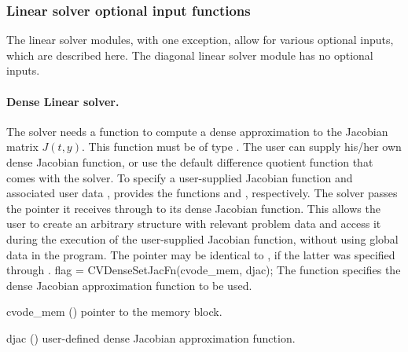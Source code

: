 \subsubsection{Linear solver optional input functions}

The linear solver modules, with one exception, allow for various optional 
inputs, which are described here. The diagonal linear solver module has no
optional inputs.

\noindent\paragraph{\bf Dense Linear solver.}
The 
{\cvdense} solver needs a function to compute a dense approximation to
the Jacobian matrix $J(t,y)$.  This function must be of type . 
The user can supply his/her own dense Jacobian function, or use the default 
difference quotient function  
that comes with the {\cvdense} solver.
To specify a user-supplied Jacobian function  and associated user 
data , {\cvdense} provides the functions 
and , respectively.
The {\cvdense} solver passes the pointer it receives through  
to its dense Jacobian function. This allows the user to
create an arbitrary structure with relevant problem data and access it
during the execution of the user-supplied Jacobian function, without
using global data in the program.  The pointer  may be
identical to , if the latter was specified through .
{
  flag = CVDenseSetJacFn(cvode\_mem, djac);
}
{
  The function  specifies the dense Jacobian
  approximation function to be used.
}
{
  \begin{args}
  \item[cvode\_mem] ()
    pointer to the {\cvode} memory block.
  \item[djac] ()
    user-defined dense Jacobian approximation function.
  \end{args}
}
